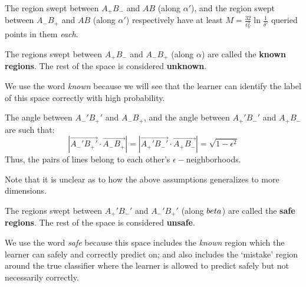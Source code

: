 \begin{assumption}
\label{ass:population}
The region swept between $A_+B_-$ and $AB$ (along $\alpha'$), and the region swept between $A_-B_+$ and $AB$ (along $\alpha'$) respectively have at least $M =\frac{32}{\epsilon_Y^2} \ln\frac{1}{\delta'}$ queried points in them \textit{each}.
\end{assumption}


\begin{dfn}
The regions swept between $A_+ B_-$ and $A_-B_+$ (along $\alpha$) are called the \textbf{known regions}. The rest of the space is considered \textbf{unknown}. 
\end{dfn}

We use the word \textit{known} because we will see that the learner can identify the label of this space correctly with high probability.

\begin{assumption}
The angle between $A_-'B_+'$ and $A_-B_+$, and the angle between $A_+'B_-'$ and $A_+B_-$ are such that:
\begin{equation}
 |\vec{A_-'B_+'} \cdot \vec{A_-B_+} | = |\vec{A_+'B_-'} \cdot \vec{A_+B_-}| = \sqrt{1-\epsilon^2}
\end{equation}
Thus, the pairs of lines belong to each other's $\epsilon-$neighborhoods.
\end{assumption}

Note that it is unclear as to how the above assumptions generalizes to more dimensions.


\begin{dfn}
The regions swept between $A_+' B_-'$ and $A_-'B_+'$ (along $\\beta$) are called the \textbf{safe regions}. The rest of the space is considered \textbf{unsafe}. 
\end{dfn}
We use the word \textit{safe} because this space includes the \textit{known} region which the learner can safely and correctly predict on; and also includes the `mistake' region around the true classifier where the learner is allowed to predict safely but not necessarily correctly.

